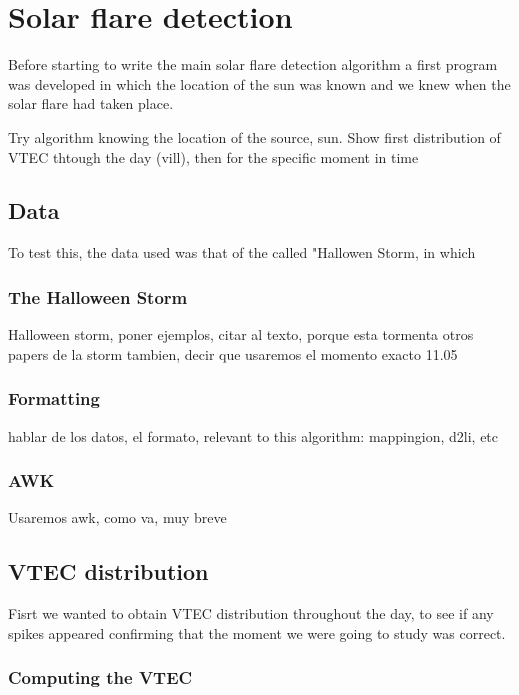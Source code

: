 \chapter{Solar flare detection}

Before starting to write the main solar flare detection algorithm a first program was developed in which the location of the sun was known and we knew when the solar flare had taken place.

Try algorithm knowing the location of the source, sun. Show first distribution of VTEC thtough the day (vill), then for the specific moment in time


\section{Data}

To test this, the data used was that of the called "Hallowen Storm, in which 

\subsection{The Halloween Storm}

Halloween storm, poner ejemplos, citar al texto, porque esta tormenta otros papers de la storm tambien, decir que usaremos el momento exacto 11.05

\subsection{Formatting}
hablar de los datos, el formato, relevant to this algorithm: mappingion, d2li, etc

\subsection{AWK}

Usaremos awk, como va, muy breve



\section{VTEC distribution}

Fisrt we wanted to obtain VTEC distribution throughout the day, to see if any spikes appeared confirming that the moment we were going to study was correct.



\subsection{Computing the VTEC}


